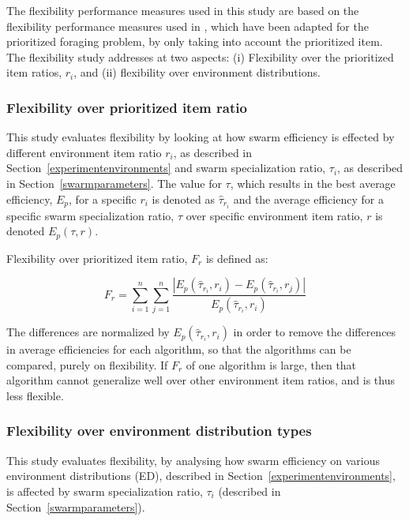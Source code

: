 The flexibility performance measures used in this study are based on the flexibility performance measures used in \cite{hecker2015beyond}, which have been adapted for the prioritized foraging problem, by only taking into account the prioritized item. The flexibility study addresses at two aspects: (i) Flexibility over the prioritized item ratios, $r_i$, and (ii) flexibility over environment distributions.

\subsubsection{Flexibility over prioritized item ratio}
\label{setup:flexibility:prioritizeditemratio}

This study evaluates flexibility by looking at how swarm efficiency is effected by different environment item ratio $r_i$, as described in Section~\ref{experimentenvironments} and swarm specialization ratio, $\tau_i$, as described in Section~\ref{swarmparameters}. The value for $\tau$, which results in the best average efficiency, $E_p$, for a specific $r_i$ is denoted as $\hat{\tau}_{r_i}$ and the average efficiency for a specific swarm specialization ratio, $\tau$ over specific environment item ratio, $r$ is denoted $E_p(\tau, r)$.

Flexibility over prioritized item ratio, $F_r$ is defined as:

\begin{equation}
	F_r = \sum_{i=1}^{n} \sum_{j=1}^{n} \dfrac{|E_p(\hat{\tau}_{r_i}, {r_i})-E_p(\hat{\tau}_{r_i}, {r_j})|}{E_p(\hat{\tau}_{r_i}, {r_i})}
\end{equation}

The differences are normalized by $E_p(\hat{\tau}_{r_i}, {r_i})$ in order to remove the differences in average efficiencies for each algorithm, so that the algorithms can be compared, purely on flexibility. If $F_r$ of one algorithm is large, then that algorithm cannot generalize well over other environment item ratios, and is thus less flexible.




\subsubsection{Flexibility over environment distribution types}
\label{setup:flexibility:environmentdistributions}

This study evaluates flexibility, by analysing how swarm efficiency on various environment distributions (ED), described in Section~\ref{experimentenvironments}, is affected by swarm specialization ratio, $\tau_i$ (described in Section~\ref{swarmparameters}).

